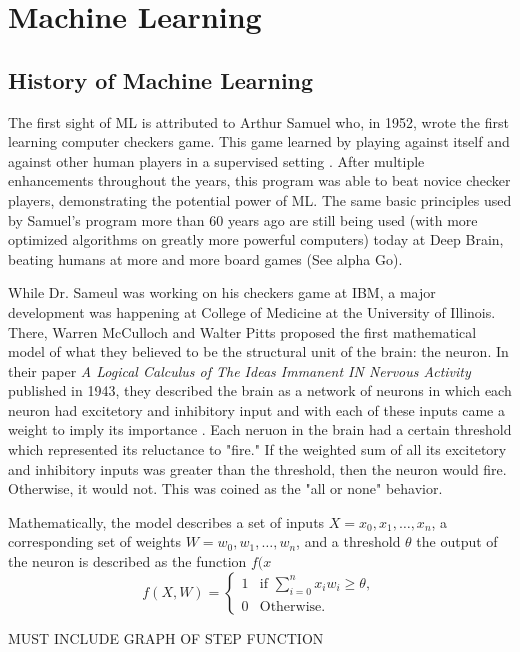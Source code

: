 \section{Machine Learning}
\subsection{History of Machine Learning}
The first sight of ML is attributed to Arthur Samuel who, in 1952, wrote the first learning computer checkers game. This game learned by playing against itself and against other human players in a supervised setting \cite{britanica1i2016}. After multiple enhancements throughout the years, this program was able to beat novice checker players, demonstrating the potential power of ML. The same basic principles used by Samuel's program more than 60 years ago are still being used (with more optimized algorithms on greatly more powerful computers) today at Deep Brain, beating humans at more and more board games (See alpha Go).

While Dr. Sameul was working on his checkers game at IBM, a major development was happening at College of Medicine at the University of Illinois. There, Warren McCulloch and Walter Pitts proposed the first mathematical model of what they believed to be the structural unit of the brain: the neuron. In their paper \textit{A Logical Calculus of The Ideas Immanent IN Nervous Activity} published in 1943, they described the brain as a network of neurons in which each neuron had excitetory and inhibitory input and with each of these inputs came a weight to imply its importance \cite{mcculloch1943logical}. Each neruon in the brain had a certain threshold which represented its reluctance to "fire." If the weighted sum of all its excitetory and inhibitory inputs was greater than the threshold, then the neuron would fire. Otherwise, it would not. This was coined as the "all or none" behavior.

Mathematically, the model describes a set of inputs $X = x_0, x_1, \dots, x_n$, a corresponding set of weights $W = w_0, w_1, \dots, w_n$, and a threshold $\theta$ the output of the neuron is described as the function $f(x$
\[
f(X,W)=
\begin{cases}
1 &\text{if } \sum_{i=0}^n x_iw_i \geq \theta,\\
0 &\text{Otherwise.}
\end{cases}
\]

MUST INCLUDE GRAPH OF STEP FUNCTION

